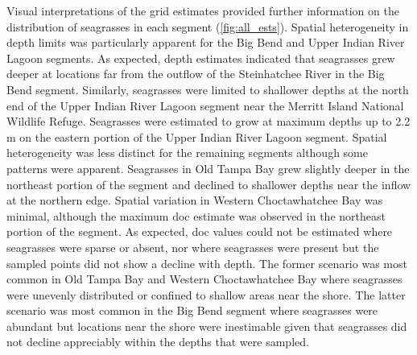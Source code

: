 \documentclass[letterpaper,12pt,oneside]{article}\usepackage[]{graphicx}\usepackage[]{color}
\begin{document}
Visual interpretations of the grid estimates provided further information on the distribution of seagrasses in each segment (\cref{fig:all_ests}).  Spatial heterogeneity in depth limits was particularly apparent for the Big Bend and Upper Indian River Lagoon segments.  As expected, depth estimates indicated that seagrasses grew deeper at locations far from the outflow of the Steinhatchee River in the Big Bend segment.  Similarly, seagrasses were limited to shallower depths at the north end of the Upper Indian River Lagoon segment near the Merritt Island National Wildlife Refuge. Seagrasses were estimated to grow at maximum depths up to 2.2 m on the eastern portion of the Upper Indian River Lagoon segment.  Spatial heterogeneity was less distinct for the remaining segments although some patterns were apparent.  Seagrasses in Old Tampa Bay grew slightly deeper in the northeast portion of the segment and declined to shallower depths near the inflow at the northern edge.  Spatial variation in Western Choctawhatchee Bay was minimal, although the maximum \ac{doc} estimate was observed in the northeast portion of the segment.  As expected, \ac{doc} values could not be estimated where seagrasses were sparse or absent, nor where seagrasses were present but the sampled points did not show a decline with depth.  The former scenario was most common in Old Tampa Bay and Western Choctawhatchee Bay where seagrasses were unevenly distributed or confined to shallow areas near the shore.  The latter scenario was most common in the Big Bend segment where seagrasses were abundant but locations near the shore were inestimable given that seagrasses did not decline appreciably within the depths that were sampled.   
\end{document}
